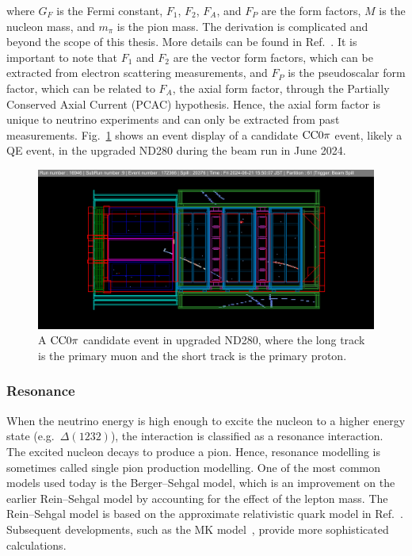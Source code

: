 where $G_F$ is the Fermi constant, $F_1$, $F_2$, $F_A$, and $F_P$ are the form factors, $M$ is the nucleon mass, and $m_\pi$ is the pion mass.
The derivation is complicated and beyond the scope of this thesis. 
More details can be found in Ref.~\cite{LlewellynSmith:1978te}.
It is important to note that $F_1$ and $F_2$ are the vector form factors, which can be extracted from electron scattering measurements, and $F_P$ is the pseudoscalar form factor, which can be related to $F_A$, the axial form factor, through the Partially Conserved Axial Current (PCAC) hypothesis.
Hence, the axial form factor is unique to neutrino experiments and can only be extracted from past measurements.
Fig.~\ref{fig:cc0pi} shows an event display of a candidate $\textrm{CC}0\pi$ event, likely a QE event, in the upgraded ND280 during the beam run in June 2024.

\begin{figure}[!htb] 	
    \centering 		
    \includegraphics[width=\sgfigwid\textwidth]{figures/cc0pi.png}
    \caption{\label{fig:cc0pi} A $\textrm{CC}0\pi$ candidate event in upgraded ND280, where the long track is the primary muon and the short track is the primary proton.} 
\end{figure}

\subsubsection{Resonance}
When the neutrino energy is high enough to excite the nucleon to a higher energy state (e.g.\ $\Delta(1232)$), the interaction is classified as a resonance interaction.
The excited nucleon decays to produce a pion. 
Hence, resonance modelling is sometimes called single pion production modelling.
One of the most common models used today is the Berger–Sehgal model, which is an improvement on the earlier Rein–Sehgal model by accounting for the effect of the lepton mass.
The Rein–Sehgal model is based on the approximate relativistic quark model in Ref.~\cite{Feynman:1971wr}.
Subsequent developments, such as the MK model~\cite{Kabirnezhad:2017jmf,Kabirnezhad:2020wtp,Kabirnezhad:2022znc}, provide more sophisticated calculations.

